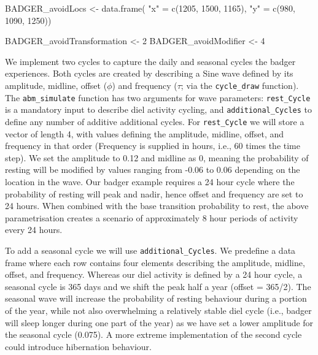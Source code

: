 \documentclass[10pt,a4paper]{article}
\newenvironment{Shaded}{}{}
\newcommand{\DecValTok}[1]{#1}
\newcommand{\FunctionTok}[1]{#1}
\newcommand{\NormalTok}[1]{#1}
\newcommand{\OtherTok}[1]{#1}
\newcommand{\StringTok}[1]{#1}
\begin{document}
\begin{Shaded}
\begin{Highlighting}[]
\NormalTok{BADGER\_avoidLocs }\OtherTok{\textless{}{-}} \FunctionTok{data.frame}\NormalTok{(}
  \StringTok{"x"} \OtherTok{=} \FunctionTok{c}\NormalTok{(}\DecValTok{1205}\NormalTok{, }\DecValTok{1500}\NormalTok{, }\DecValTok{1165}\NormalTok{),}
  \StringTok{"y"} \OtherTok{=} \FunctionTok{c}\NormalTok{(}\DecValTok{980}\NormalTok{, }\DecValTok{1090}\NormalTok{, }\DecValTok{1250}\NormalTok{))}

\NormalTok{BADGER\_avoidTransformation }\OtherTok{\textless{}{-}} \DecValTok{2}
\NormalTok{BADGER\_avoidModifier }\OtherTok{\textless{}{-}} \DecValTok{4}
\end{Highlighting}
\end{Shaded}

We implement two cycles to capture the daily and seasonal cycles the badger experiences.
Both cycles are created by describing a Sine wave defined by its amplitude, midline, offset (\(\phi\)) and frequency (\(\tau\); via the \texttt{cycle\_draw} function).
The \texttt{abm\_simulate} function has two arguments for wave parameters: \texttt{rest\_Cycle} is a mandatory input to describe diel activity cycling, and \texttt{additional\_Cycles} to define any number of additive additional cycles.
For \texttt{rest\_Cycle} we will store a vector of length 4, with values defining the amplitude, midline, offset, and frequency in that order (Frequency is supplied in hours, i.e., 60 times the time step).
We set the amplitude to 0.12 and midline as 0, meaning the probability of resting will be modified by values ranging from -0.06 to 0.06 depending on the location in the wave.
Our badger example requires a 24 hour cycle where the probability of resting will peak and nadir, hence offset and frequency are set to 24 hours.
When combined with the base transition probability to rest, the above parametrisation creates a scenario of approximately 8 hour periods of activity every 24 hours.

To add a seasonal cycle we will use \texttt{additional\_Cycles}.
We predefine a data frame where each row contains four elements describing the amplitude, midline, offset, and frequency.
Whereas our diel activity is defined by a 24 hour cycle, a seasonal cycle is 365 days and we shift the peak half a year (offset = 365/2).
The seasonal wave will increase the probability of resting behaviour during a portion of the year, while not also overwhelming a relatively stable diel cycle (i.e., badger will sleep longer during one part of the year) as we have set a lower amplitude for the seasonal cycle (0.075).
A more extreme implementation of the second cycle could introduce hibernation behaviour.
\end{document}
